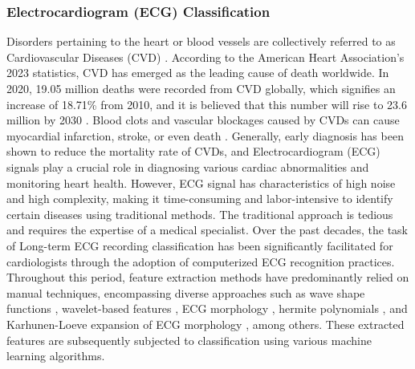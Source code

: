 \documentclass[preprint,12pt]{elsarticle}
\begin{document}
\subsubsection{Electrocardiogram (ECG) Classification}
Disorders pertaining to the heart or blood vessels are collectively referred to as Cardiovascular Diseases (CVD) \citep{LIU2021107187}. According to the American Heart Association's 2023 statistics, CVD has emerged as the leading cause of death worldwide. In 2020, 19.05 million deaths were recorded from CVD globally, which signifies an increase of 18.71\% from 2010, and it is believed that this number will rise to 23.6 million by 2030 \citep{tsao2023heart}. Blood clots and vascular blockages caused by CVDs can cause myocardial infarction, stroke, or even death \citep{LIU2021107187}. Generally, early diagnosis has been shown to reduce the mortality rate of CVDs, and Electrocardiogram (ECG) signals play a crucial role in diagnosing various cardiac abnormalities and monitoring heart health. However, ECG signal has characteristics of high noise and high complexity, making it time-consuming and labor-intensive to identify certain diseases using traditional methods. The traditional approach is tedious and requires the expertise of a medical specialist. Over the past decades, the task of Long-term ECG recording classification has been significantly facilitated for cardiologists through the adoption of computerized ECG recognition practices. Throughout this period, feature extraction methods have predominantly relied on manual techniques, encompassing diverse approaches such as wave shape functions \citep{LLamedo2011}, wavelet-based features \citep{MATHEWS201853}, ECG morphology \citep{zhu2019}, hermite polynomials \citep{desai2021low}, and Karhunen-Loeve expansion of ECG morphology \citep{crippa2015multi}, among others. These extracted features are subsequently subjected to classification using various machine learning algorithms. 
\end{document}
